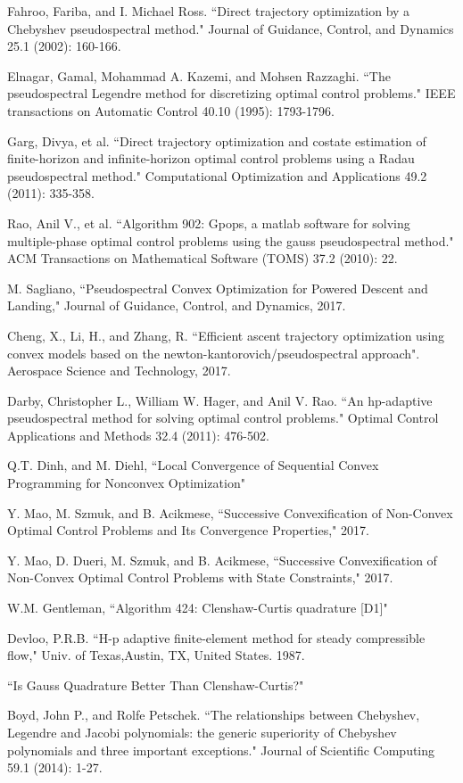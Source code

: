 \documentclass[10pt,a4paper]{article}
\begin{document}
\begin{thebibliography}{1}
		Fahroo, Fariba, and I. Michael Ross. ``Direct trajectory optimization by a Chebyshev pseudospectral method." Journal of Guidance, Control, and Dynamics 25.1 (2002): 160-166.
		
		Elnagar, Gamal, Mohammad A. Kazemi, and Mohsen Razzaghi. ``The pseudospectral Legendre method for discretizing optimal control problems." IEEE transactions on Automatic Control 40.10 (1995): 1793-1796.
		
		Garg, Divya, et al. ``Direct trajectory optimization and costate estimation of finite-horizon and infinite-horizon optimal control problems using a Radau pseudospectral method." Computational Optimization and Applications 49.2 (2011): 335-358.
		
		Rao, Anil V., et al. ``Algorithm 902: Gpops, a matlab software for solving multiple-phase optimal control problems using the gauss pseudospectral method." ACM Transactions on Mathematical Software (TOMS) 37.2 (2010): 22.				
				
		M. Sagliano, ``Pseudospectral Convex Optimization for Powered Descent and Landing," Journal of Guidance, Control, and Dynamics, 2017.
		
		Cheng, X., Li, H., and Zhang, R. ``Efficient ascent trajectory optimization using convex models based on the newton-kantorovich/pseudospectral approach". Aerospace Science and Technology, 2017.
		
		Darby, Christopher L., William W. Hager, and Anil V. Rao. ``An hp-adaptive pseudospectral method for solving optimal control problems." Optimal Control Applications and Methods 32.4 (2011): 476-502.
		
		Q.T. Dinh, and M. Diehl, ``Local Convergence of Sequential Convex Programming for Nonconvex Optimization"
		
		Y. Mao, M. Szmuk, and B. Acikmese, ``Successive Convexification of Non-Convex Optimal Control Problems and Its Convergence Properties," 2017.
		
		Y. Mao, D. Dueri, M. Szmuk, and B. Acikmese, ``Successive Convexification of Non-Convex Optimal Control Problems with State Constraints," 2017.
		
		W.M. Gentleman, ``Algorithm 424: Clenshaw-Curtis quadrature [D1]"
		
		Devloo, P.R.B. ``H-p adaptive finite-element method for steady compressible flow," Univ. of Texas,Austin, TX, United States. 1987.
		
		``Is Gauss Quadrature Better Than Clenshaw-Curtis?"
		
		Boyd, John P., and Rolfe Petschek. ``The relationships between Chebyshev, Legendre and Jacobi polynomials: the generic superiority of Chebyshev polynomials and three important exceptions." Journal of Scientific Computing 59.1 (2014): 1-27.
		
	\end{thebibliography}
\end{document}
